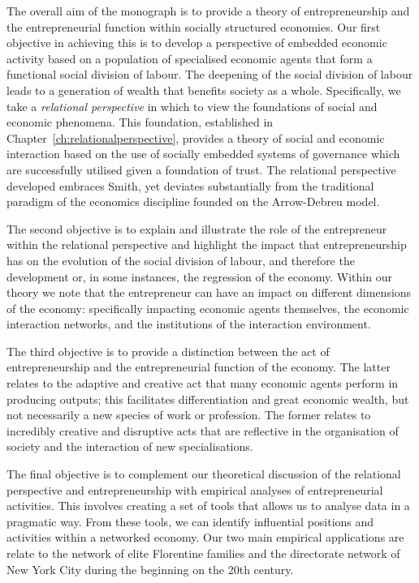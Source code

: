 The overall aim of the monograph is to provide a theory of entrepreneurship and the entrepreneurial function within socially structured economies. Our first objective in achieving this is to develop a perspective of embedded economic activity based on a population of specialised economic agents that form a functional social division of labour. The deepening of the social division of labour leads to a generation of wealth that benefits society as a whole. Specifically, we take a \emph{relational perspective} in which to view the foundations of social and economic phenomena. This foundation, established in Chapter~\ref{ch:relationalperspective}, provides a theory of social and economic interaction based on the use of socially embedded systems of governance which are successfully utilised given a foundation of trust. The relational perspective developed embraces Smith, yet deviates substantially from the traditional paradigm of the economics discipline founded on the Arrow-Debreu model.

The second objective is to explain and illustrate the role of the entrepreneur within the relational perspective and highlight the impact that entrepreneurship has on the evolution of the social division of labour, and therefore the development or, in some instances, the regression of the economy. Within our theory we note that the entrepreneur can have an impact on different dimensions of the economy: specifically impacting economic agents themselves, the economic interaction networks, and the institutions of the interaction environment.

The third objective is to provide a distinction between the act of entrepreneurship and the entrepreneurial function of the economy. The latter relates to the adaptive and creative act that many economic agents perform in producing outputs; this facilitates differentiation and great economic wealth, but not necessarily a new species of work or profession. The former relates to incredibly creative and disruptive acts that are reflective in the organisation of society and the interaction of new specialisations.

The final objective is to complement our theoretical discussion of the relational perspective and entrepreneurship with empirical analyses of entrepreneurial activities. This involves creating a set of tools that allows us to analyse data in a pragmatic way. From these tools, we can identify influential positions and activities within a networked economy. Our two main empirical applications are relate to the network of elite Florentine families and the directorate network of New York City during the beginning on the 20th century.

